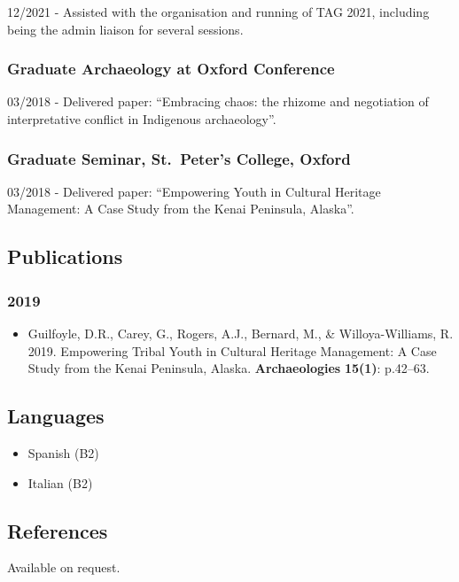 \documentclass[11pt,a4paper]{article}
\providecommand{\tightlist}{%
  \setlength{\itemsep}{0pt}\setlength{\parskip}{0pt}}
\begin{document}
12/2021 - Assisted with the organisation and running of TAG 2021,
including being the admin liaison for several sessions.

\subsubsection{\texorpdfstring{\textbf{Graduate Archaeology at Oxford
Conference}}{Graduate Archaeology at Oxford Conference}}\label{graduate-archaeology-at-oxford-conference}

03/2018 - Delivered paper: ``Embracing chaos: the rhizome and
negotiation of interpretative conflict in Indigenous archaeology''.

\subsubsection{\texorpdfstring{\textbf{Graduate Seminar, St.~Peter's
College,
Oxford}}{Graduate Seminar, St.~Peter's College, Oxford}}\label{graduate-seminar-st.-peters-college-oxford}

03/2018 - Delivered paper: ``Empowering Youth in Cultural Heritage
Management: A Case Study from the Kenai Peninsula, Alaska''.

\subsection{Publications}\label{publications}

\subsubsection{2019}\label{section}

\begin{itemize}
\tightlist
\item
  Guilfoyle, D.R., Carey, G., Rogers, A.J., Bernard, M., \&
  Willoya-Williams, R. 2019. Empowering Tribal Youth in Cultural
  Heritage Management: A Case Study from the Kenai Peninsula, Alaska.
  \textbf{Archaeologies} \textbf{15(1)}: p.42--63.
\end{itemize}

\subsection{Languages}\label{languages}

\begin{itemize}
\tightlist
\item
  Spanish (B2)
\item
  Italian (B2)
\end{itemize}

\subsection{References}\label{references}

Available on request.
\end{document}
